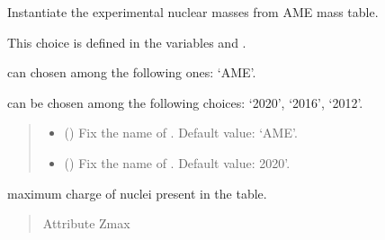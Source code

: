 \documentclass[letterpaper,10pt,english]{sphinxmanual}
\begin{document}
\begin{fulllineitems}
\label{\detokenize{source/api/setup_masses_exp:nucleardatapy.setup_masses_exp.SetupMassesExp}}
\pysigstartsignatures
{}
\pysigstopsignatures
\sphinxAtStartPar
Instantiate the experimental nuclear masses from AME mass table.

\sphinxAtStartPar
This choice is defined in the variables  and .

\sphinxAtStartPar
{} can chosen among the following ones: ‘AME’.

\sphinxAtStartPar
{} can be chosen among the following choices: ‘2020’, ‘2016’, ‘2012’.
\begin{quote}\begin{description}
\begin{itemize}
\item {} 
\sphinxAtStartPar
{} (\sphinxstyleliteralemphasis{\sphinxupquote{, }}) \textendash{} Fix the name of . Default value: ‘AME’.

\item {} 
\sphinxAtStartPar
{} (\sphinxstyleliteralemphasis{\sphinxupquote{, }}) \textendash{} Fix the name of . Default value: 2020’.

\end{itemize}

\end{description}\end{quote}

\sphinxAtStartPar
{}

\begin{fulllineitems}
\label{\detokenize{source/api/setup_masses_exp:nucleardatapy.setup_masses_exp.SetupMassesExp.Zmax}}
\pysigstartsignatures
{}
\pysigstopsignatures
\sphinxAtStartPar
maximum charge of nuclei present in the table.
\begin{quote}\begin{description}
\sphinxAtStartPar
Attribute Zmax


\end{description}
\end{quote}
\end{fulllineitems}
\end{fulllineitems}
\end{document}
